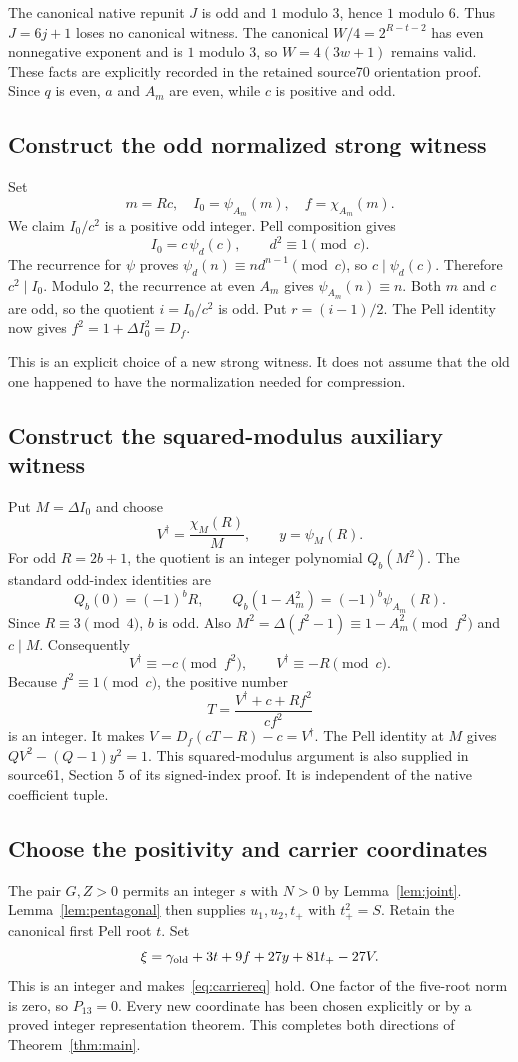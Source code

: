 \documentclass[11pt]{article}
\theoremstyle{remark}\newtheorem{remark}[theorem]{Remark}
\begin{document}
The canonical native repunit $J$ is odd and $1$ modulo $3$, hence $1$
modulo $6$. Thus $J=6j+1$ loses no canonical witness. The canonical
$W/4=2^{R-t-2}$ has even nonnegative exponent and is $1$ modulo $3$,
so $W=4(3w+1)$ remains valid. These facts are explicitly recorded in the
retained source70 orientation proof. Since $q$ is even, $a$ and $A_m$
are even, while $c$ is positive and odd.

\subsection{Construct the odd normalized strong witness}
Set
\[
 m=Rc,\quad I_0=\psi_{A_m}(m),\quad f=\chi_{A_m}(m).
\]
We claim $I_0/c^2$ is a positive odd integer. Pell composition gives
\[
 I_0=c\,\psi_d(c),\qquad d^2\equiv1\pmod c.
\]
The recurrence for $\psi$ proves
$\psi_d(n)\equiv n d^{n-1}\pmod c$, so $c\mid\psi_d(c)$.
Therefore $c^2\mid I_0$. Modulo $2$, the recurrence at even $A_m$
gives $\psi_{A_m}(n)\equiv n$. Both $m$ and $c$ are odd, so the
quotient $i=I_0/c^2$ is odd. Put $r=(i-1)/2$. The Pell identity now
gives $f^2=1+\Delta I_0^2=D_f$.

This is an explicit choice of a new strong witness. It does not assume that
the old one happened to have the normalization needed for compression.

\subsection{Construct the squared-modulus auxiliary witness}
Put $M=\Delta I_0$ and choose
\[
 V^{\dagger}=\frac{\chi_M(R)}{M},\qquad y=\psi_M(R).
\]
For odd $R=2b+1$, the quotient is an integer polynomial $Q_b(M^2)$.
The standard odd-index identities are
\[
 Q_b(0)=(-1)^bR,\qquad Q_b(1-A_m^2)=(-1)^b\psi_{A_m}(R).
\]
Since $R\equiv3\pmod4$, $b$ is odd. Also
$M^2=\Delta(f^2-1)\equiv1-A_m^2\pmod{f^2}$ and $c\mid M$.
Consequently
\[
 V^{\dagger}\equiv-c\pmod{f^2},\qquad
 V^{\dagger}\equiv-R\pmod c.
\]
Because $f^2\equiv1\pmod c$, the positive number
\[
 T=\frac{V^{\dagger}+c+Rf^2}{cf^2}
\]
is an integer. It makes $V=D_f(cT-R)-c=V^{\dagger}$. The Pell
identity at $M$ gives $QV^2-(Q-1)y^2=1$.
This squared-modulus argument is also supplied in source61, Section 5 of
its signed-index proof. It is independent of the native coefficient tuple.

\subsection{Choose the positivity and carrier coordinates}
The pair $G,Z>0$ permits an integer $s$ with $N>0$ by
Lemma~\ref{lem:joint}. Lemma~\ref{lem:pentagonal} then supplies
$u_1,u_2,t_+$ with $t_+^2=S$. Retain the canonical first Pell root $t$.
Set
\[
 \xi=\gamma_{\rm old}+3t+9f+27y+81t_+-27V.
\]
This is an integer and makes~\eqref{eq:carriereq} hold. One factor of
the five-root norm is zero, so $P_{13}=0$. Every new coordinate has been
chosen explicitly or by a proved integer representation theorem. This
completes both directions of Theorem~\ref{thm:main}.
\end{document}

